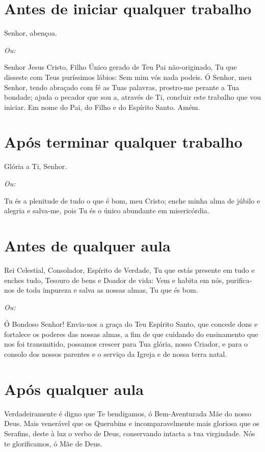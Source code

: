 \documentclass{subfiles}
\begin{document}

\section*{Antes de iniciar qualquer trabalho}

Senhor, abençoa.

\textit{Ou:}

Senhor Jesus Cristo, Filho Único gerado de Teu Pai não-originado, Tu que 
disseste com Teus puríssimos lábios: Sem mim vós nada podeis. Ó Senhor, meu 
Senhor, tendo abraçado com fé as Tuas palavras, prostro-me perante a Tua 
bondade; ajuda o pecador que sou a, através de Ti, concluir este trabalho que 
vou iniciar. Em nome do Pai, do Filho e do Espírito Santo. Amém.

\section*{Após terminar qualquer trabalho}

Glória a Ti, Senhor.

\textit{Ou:}

Tu és a plenitude de tudo o que é bom, meu Cristo; enche minha alma de júbilo 
e alegria e salva-me, pois Tu és o único abundante em misericórdia. 

 
\section*{Antes de qualquer aula} 

Rei Celestial, Consolador, Espírito de Verdade, Tu que estás presente em tudo 
e enches tudo, Tesouro de bens e Doador de vida: Vem e habita em nós,
purifica-nos de toda impureza e salva as nossas almas, Tu que és bom. 

\textit{Ou:}

Ó Bondoso Senhor! Envia-nos a graça do Teu Espírito Santo, que concede dons e
fortalece os poderes das nossas almas, a fim de que cuidando do ensinamento que
nos foi transmitido, possamos crescer para Tua glória, nosso Criador, e para o
consolo dos nossos parentes e o serviço da Igreja e de nossa terra natal.

\section*{Após qualquer aula}

Verdadeiramente é digno que Te bendigamos, ó Bem-Aven\-turada Mãe do 
nosso Deus. Mais venerável que os Querubins e incomparavelmente mais 
gloriosa que os Serafins, deste à luz o verbo de Deus, conservando intacta a 
tua virgindade. Nós te glorificamos, ó Mãe de Deus.
\end{document}
